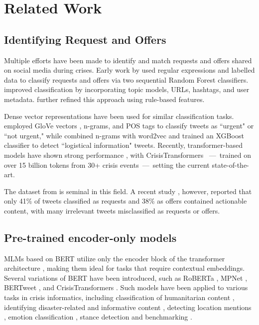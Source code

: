 \section{Related Work}
\subsection{Identifying Request and Offers}
Multiple efforts have been made to identify \cite{purohit2014emergency,nazer2016finding,devaraj2020machine,ullah2021rweetminer,lamsal2024crema} and match \cite{purohit2014emergency,dutt2019utilizing,lamsal2024crema} requests and offers shared on social media during crises. Early work by \cite{purohit2014emergency} used regular expressions and labelled data to classify requests and offers via two sequential Random Forest classifiers. \cite{nazer2016finding} improved classification by incorporating topic models, URLs, hashtags, and user metadata. \cite{ullah2021rweetminer} further refined this approach using rule-based features.

Dense vector representations have been used for similar classification tasks. \cite{devaraj2020machine} employed GloVe vectors \cite{pennington2014glove}, n-grams, and POS tags to classify tweets as ``urgent" or ``not urgent," while \cite{he2017signals} combined n-grams with word2vec \cite{Mikolov2013EfficientEO} and trained an XGBoost classifier to detect ``logistical information" tweets. Recently, transformer-based models \cite{vaswani2017attention} have shown strong performance \cite{zhou2022victimfinder,lamsal2024crema}, with CrisisTransformers \cite{lamsal2024crisistransformers}~---~trained on over 15 billion tokens from 30+ crisis events~---~setting the current state-of-the-art.

The dataset from \cite{purohit2014emergency} is seminal in this field. A recent study \cite{lamsal2024crema}, however, reported that only 41\% of tweets classified as requests and 38\% as offers contained actionable content, with many irrelevant tweets misclassified as requests or offers.



\subsection{Pre-trained encoder-only models}
MLMs based on BERT \cite{devlin2018bert} utilize only the encoder block of the transformer architecture \cite{vaswani2017attention}, making them ideal for tasks that require contextual embeddings. Several variations of BERT have been introduced, such as RoBERTa \cite{liu2019roberta}, MPNet \cite{song2020mpnet}, BERTweet \cite{nguyen2020bertweet}, and CrisisTransformers \cite{lamsal2024crisistransformers}. Such models have been applied to various tasks in crisis informatics, including classification of humanitarian content \cite{alam2021crisisbench}, identifying disaster-related \cite{prasad2023identification} and informative content \cite{alam2021crisisbench,koshy2023multimodal}, detecting location mentions \cite{suwaileh2023idrisi}, emotion classification \cite{myint2024unveiling}, stance detection \cite{poddar2022winds,cotfas2021longest,hayawi2022anti} and benchmarking \cite{lamsal2024crisistransformers}.


